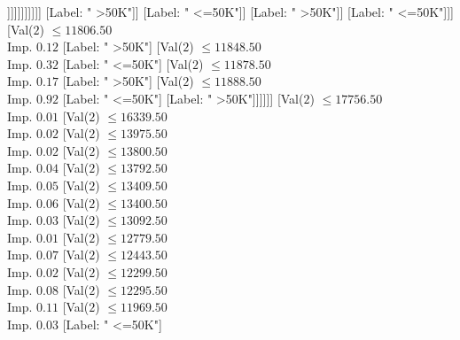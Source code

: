 \documentclass[margin=10pt]{standalone}
\begin{document}
\begin{forest}
																										[Label: " >50K"]
																										[Val($2$) $ \leq 11287.50$ \\ Imp. $0.17$
																											[Label: " <=50K"]
																											[Val($2$) $ \leq 11334.50$ \\ Imp. $0.31$
																												[Label: " >50K"]
																												[Val($2$) $ \leq 11376.50$ \\ Imp. $0.25$
																													[Label: " >50K"]
																													[Label: " <=50K"]]]]]]]]]]]
																			[Label: " >50K"]]
																		[Label: " <=50K"]]
																	[Label: " >50K"]]
																[Label: " <=50K"]]]
														[Val($2$) $ \leq 11806.50$ \\ Imp. $0.12$
															[Label: " >50K"]
															[Val($2$) $ \leq 11848.50$ \\ Imp. $0.32$
																[Label: " <=50K"]
																[Val($2$) $ \leq 11878.50$ \\ Imp. $0.17$
																	[Label: " >50K"]
																	[Val($2$) $ \leq 11888.50$ \\ Imp. $0.92$
																		[Label: " <=50K"]
																		[Label: " >50K"]]]]]]
													[Val($2$) $ \leq 17756.50$ \\ Imp. $0.01$
														[Val($2$) $ \leq 16339.50$ \\ Imp. $0.02$
															[Val($2$) $ \leq 13975.50$ \\ Imp. $0.02$
																[Val($2$) $ \leq 13800.50$ \\ Imp. $0.04$
																	[Val($2$) $ \leq 13792.50$ \\ Imp. $0.05$
																		[Val($2$) $ \leq 13409.50$ \\ Imp. $0.06$
																			[Val($2$) $ \leq 13400.50$ \\ Imp. $0.03$
																				[Val($2$) $ \leq 13092.50$ \\ Imp. $0.01$
																					[Val($2$) $ \leq 12779.50$ \\ Imp. $0.07$
																						[Val($2$) $ \leq 12443.50$ \\ Imp. $0.02$
																							[Val($2$) $ \leq 12299.50$ \\ Imp. $0.08$
																								[Val($2$) $ \leq 12295.50$ \\ Imp. $0.11$
																									[Val($2$) $ \leq 11969.50$ \\ Imp. $0.03$
																										[Label: " <=50K"]

\end{forest}
\end{document}
